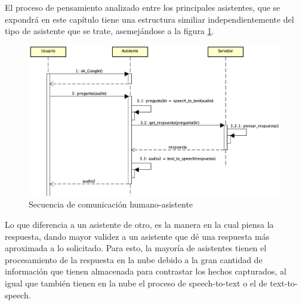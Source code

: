 El proceso de pensamiento analizado entre los principales asistentes, que se expondrá en este capítulo tiene una estructura similiar independientemente del tipo de asistente que se trate, asemejándose a la figura \ref{fig:humasseq}.

\begin{figure}[h!]
    \centering
    \includegraphics[width=14cm]{./img/sequence/humasseq.png}
    \caption{Secuencia de comunicación humano-asistente}
    \label{fig:humasseq}
\end{figure}

Lo que diferencia a un asistente de otro, es la manera en la cual piensa la respuesta, dando mayor validez a un asistente que dé una respuesta más aproximada a lo solicitado.
Para esto, la mayoría de asistentes tienen el procesamiento de la respuesta en la nube debido a la gran cantidad de información que tienen almacenada para contrastar los hechos capturados, al igual que también tienen en la nube el proceso de speech-to-text o el de text-to-speech.
